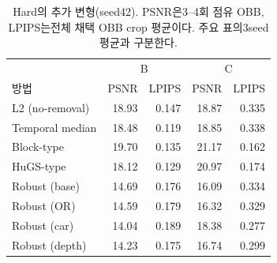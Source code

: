 \begin{table}[htbp]\centering\small
\caption{Hard의 추가 변형(seed42). PSNR은3--4회 점유 OBB, LPIPS는전체 채택 OBB crop 평균이다. 주요 표의3seed 평균과 구분한다.}
\begin{tabular}{lrrrr}\toprule & \multicolumn{2}{c}{B} & \multicolumn{2}{c}{C}\\ 방법 & PSNR & LPIPS & PSNR & LPIPS\\\midrule
L2 (no-removal) & 18.93 & 0.147 & 18.87 & 0.335 \\
Temporal median & 18.48 & 0.119 & 18.85 & 0.338 \\
Block-type & 19.70 & 0.135 & 21.17 & 0.162 \\
HuGS-type & 18.12 & 0.129 & 20.97 & 0.174 \\
Robust (base) & 14.69 & 0.176 & 16.09 & 0.334 \\
Robust (OR) & 14.59 & 0.179 & 16.32 & 0.329 \\
Robust (car) & 14.04 & 0.189 & 18.38 & 0.277 \\
Robust (depth) & 14.23 & 0.175 & 16.74 & 0.299 \\\bottomrule\end{tabular}\end{table}
